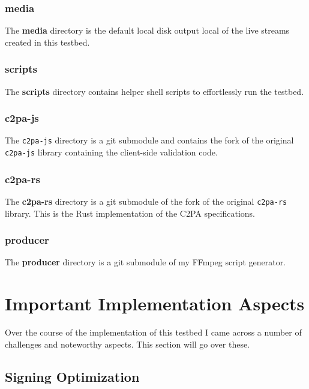 \subsubsection{media}

The \textbf{media} directory is the default local disk output local of the live streams created in this testbed.

\subsubsection{scripts}

The \textbf{scripts} directory contains helper shell scripts to effortlessly run the testbed.

\subsubsection{c2pa-js}

The \texttt{c2pa-js} directory is a git submodule and contains the fork of the original \texttt{c2pa-js} library containing the client-side validation code.

\subsubsection{c2pa-rs} 

The \textbf{c2pa-rs} directory is a git submodule of the fork of the original \texttt{c2pa-rs} library. This is the Rust implementation of the C2PA specifications.

\subsubsection{producer}

The \textbf{producer} directory is a git submodule of my FFmpeg script generator.

\section{Important Implementation Aspects\label{sec:implaspects}}

Over the course of the implementation of this testbed I came across a number of challenges and noteworthy aspects. This section will go over these.

\subsection{Signing Optimization\label{sec:optimization}}

